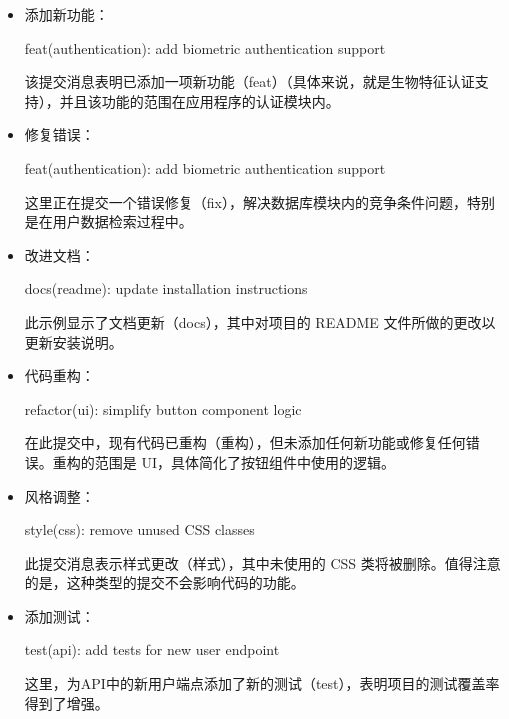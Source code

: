 \begin{itemize}
\item
添加新功能：

\begin{shell}
feat(authentication): add biometric authentication support
\end{shell}

该提交消息表明已添加一项新功能（feat）（具体来说，就是生物特征认证支持），并且该功能的范围在应用程序的认证模块内。

\item
修复错误：

\begin{shell}
    feat(authentication): add biometric authentication support
\end{shell}

这里正在提交一个错误修复（fix），解决数据库模块内的竞争条件问题，特别是在用户数据检索过程中。

\item
改进文档：

\begin{shell}
docs(readme): update installation instructions
\end{shell}

此示例显示了文档更新（docs），其中对项目的 README 文件所做的更改以更新安装说明。

\item
代码重构：

\begin{shell}
refactor(ui): simplify button component logic
\end{shell}

在此提交中，现有代码已重构（重构），但未添加任何新功能或修复任何错误。重构的范围是 UI，具体简化了按钮组件中使用的逻辑。

\item
风格调整：

\begin{shell}
style(css): remove unused CSS classes
\end{shell}

此提交消息表示样式更改（样式），其中未使用的 CSS 类将被删除。值得注意的是，这种类型的提交不会影响代码的功能。

\item
添加测试：

\begin{shell}
test(api): add tests for new user endpoint
\end{shell}

这里，为API中的新用户端点添加了新的测试（test），表明项目的测试覆盖率得到了增强。


\end{itemize}
